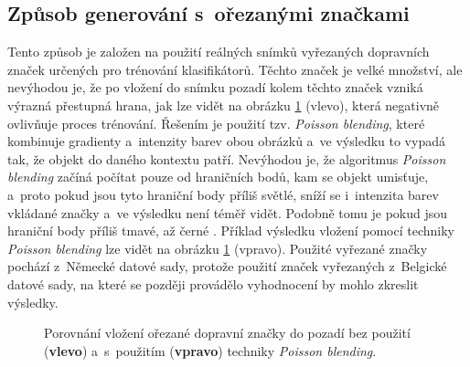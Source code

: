 \subsection*{Způsob generování s~ořezanými značkami}
\label{syntDatasetOrezane}
Tento způsob je založen na použití reálných snímků vyřezaných dopravních značek určených pro trénování klasifikátorů. Těchto značek je velké množství, ale nevýhodou je, že po vložení do snímku pozadí kolem těchto značek vzniká výrazná přestupná hrana, jak lze vidět na obrázku \ref{fig:datasetCropped} (vlevo), která negativně ovlivňuje proces trénování. Řešením je použití tzv. \emph{Poisson blending}, které kombinuje gradienty a~intenzity barev obou obrázků a~ve výsledku to vypadá tak, že objekt do daného kontextu patří. Nevýhodou je, že algoritmus \emph{Poisson blending} začíná počítat pouze od hraničních bodů, kam se objekt umisťuje, a~proto pokud jsou tyto hraniční body příliš světlé, sníží se i~intenzita barev vkládané značky a~ve výsledku není téměř vidět. Podobně tomu je pokud jsou hraniční body příliš tmavé, až černé \cite{poissonEditing}. Příklad výsledku vložení pomocí techniky \emph{Poisson blending} lze vidět na obrázku \ref{fig:datasetCropped} (vpravo). Použité vyřezané značky pochází z~Německé datové sady, protože použití značek vyřezaných z~Belgické datové sady, na které se později provádělo vyhodnocení by mohlo zkreslit výsledky.

\begin{figure}[H]
    \centering
    \hfill
    \caption{Porovnání vložení ořezané dopravní značky do pozadí bez použití (\textbf{vlevo}) a~s~použitím (\textbf{vpravo}) techniky \emph{Poisson blending}.}
    \label{fig:datasetCropped}
\end{figure}


